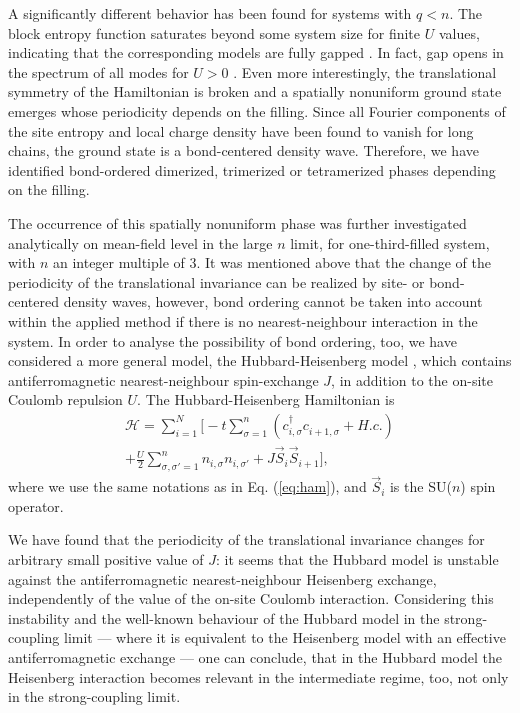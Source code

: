 \documentclass[aps,prb,twocolumn,floatfix,showpacs]{revtex4}
\begin{document}
A significantly different behavior has been found for systems with $q<n$. The
block entropy function saturates beyond some system size \cite{LSS} for finite
$U$ values, indicating that the corresponding models are fully gapped
\cite{vidal-size}.  In fact, gap opens
in the spectrum of all modes for $U>0$ \cite{BLSS}.  Even more interestingly,
the translational symmetry of the Hamiltonian is broken and a spatially
nonuniform ground state emerges whose periodicity depends on the
filling.  Since all Fourier components of the site entropy and local charge
density have been found to vanish for long chains, the ground state is a
bond-centered density wave.  Therefore, we have identified bond-ordered
dimerized, trimerized or tetramerized phases depending on the
filling.




The occurrence of this spatially nonuniform phase was further investigated
analytically on mean-field level in the large $n$ limit, for one-third-filled
system, with $n$ an integer multiple of 3. It was mentioned above that the
change of the periodicity of the translational invariance can be realized by
site- or bond-centered density waves, however, bond ordering cannot be taken
into account within the applied method \cite{LSS} if there is no
nearest-neighbour interaction in the system. In order to analyse the
possibility of bond ordering, too, we have considered a more general model,
the Hubbard-Heisenberg model \cite{marston}, which contains antiferromagnetic
nearest-neighbour spin-exchange $J$, in addition to the on-site Coulomb
repulsion $U$. The Hubbard-Heisenberg Hamiltonian is
\begin{multline}
 {\mathcal H} = \sum_{i=1}^N \bigg[ -t \sum_{\sigma=1}^n (c_{i,\sigma}^\dagger
      c_{i+1,\sigma}^{\phantom \dagger} + H.c. %
      ) \\ + \frac{U}{2} %
      \sum_{\sigma,\sigma'=1}^n n_{i, \sigma}n_{i,\sigma'} + J
      \vec{S}_i \vec{S}_{i+1} \bigg], \, \,
\end{multline}
where we use the same notations as in Eq. (\ref{eq:ham}), and
$\vec{S}_i$ is the SU($n$) spin operator.

We have found that the periodicity of the translational invariance changes for
arbitrary small positive value of $J$: it seems that the Hubbard model is
unstable against the antiferromagnetic nearest-neighbour Heisenberg exchange,
independently of the value of the on-site Coulomb interaction. Considering
this instability and the well-known behaviour of the Hubbard model in the
strong-coupling limit --- where it is equivalent to the Heisenberg model with
an effective antiferromagnetic exchange --- one can conclude, that in the
Hubbard model the Heisenberg interaction becomes relevant in the intermediate
regime, too, not only in the strong-coupling limit. 
\end{document}
